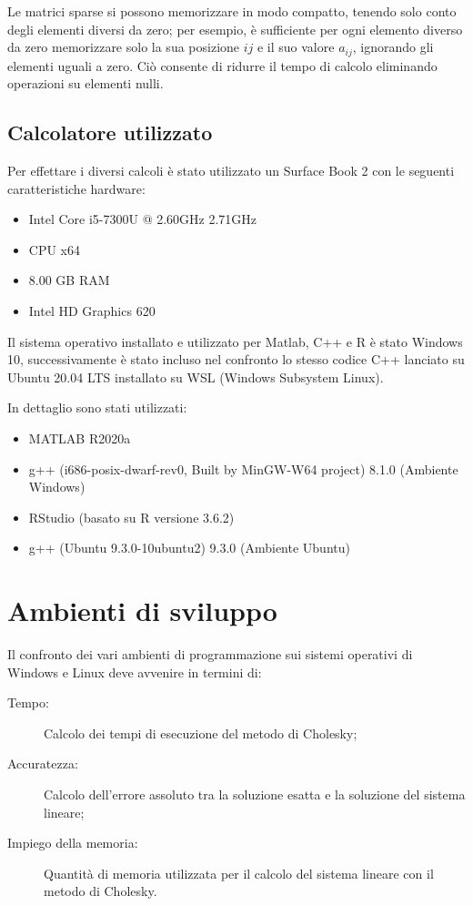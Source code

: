 \documentclass[preprint,12pt]{elsarticle}
\begin{document}
Le matrici sparse si possono memorizzare in modo compatto, tenendo solo conto degli elementi diversi da zero; per esempio, è sufficiente per ogni elemento diverso da zero memorizzare solo la sua posizione $i j$ e il suo valore $a_{ij}$, ignorando gli elementi uguali a zero. Ciò consente di ridurre il tempo di calcolo eliminando operazioni su elementi nulli.

\subsection*{Calcolatore utilizzato}

Per effettare i diversi calcoli è stato utilizzato un Surface Book 2 con le seguenti caratteristiche hardware:
\begin{itemize}
	\item Intel Core i5-7300U @ 2.60GHz 2.71GHz
	\item CPU x64
	\item 8.00 GB RAM
	\item Intel HD Graphics 620
\end{itemize}

Il sistema operativo installato e utilizzato per Matlab, C++ e R è stato Windows 10, successivamente è stato incluso nel confronto lo stesso codice C++ lanciato su Ubuntu 20.04 LTS installato su WSL (Windows Subsystem Linux).

In dettaglio sono stati utilizzati:
\begin{itemize}
	\item MATLAB R2020a
	\item g++ (i686-posix-dwarf-rev0, Built by MinGW-W64 project) 8.1.0 (Ambiente Windows)
	\item RStudio (basato su R versione 3.6.2)
	\item g++ (Ubuntu 9.3.0-10ubuntu2) 9.3.0 (Ambiente Ubuntu)
\end{itemize}

\newpage


\section*{Ambienti di sviluppo}

Il confronto dei vari ambienti di programmazione sui sistemi operativi di Windows e Linux deve avvenire in termini di:
\begin{description}
	\item[Tempo:] Calcolo dei tempi di esecuzione del metodo di Cholesky;
	\item[Accuratezza:] Calcolo dell'errore assoluto tra la soluzione esatta e la soluzione del sistema lineare;
	\item[Impiego della memoria:] Quantità di memoria utilizzata per il calcolo del sistema lineare con il metodo di Cholesky.
\end{description}
\end{document}

